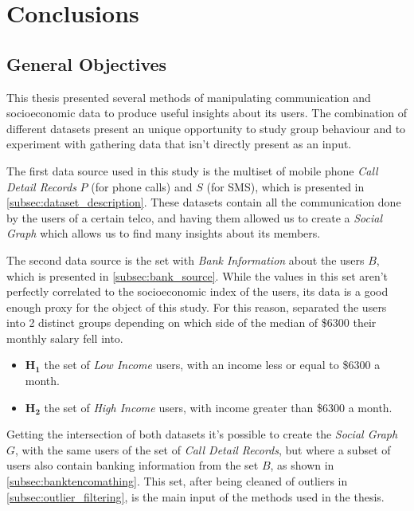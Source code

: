 \chapter{Conclusions}
\label{chap:conclusions}

\section{General Objectives}

This thesis presented several methods of manipulating communication and socioeconomic data to produce useful insights about its users.
The combination of different datasets present an unique opportunity to study group behaviour and to experiment with gathering data that isn't directly present as an input.

The first data source used in this study is the multiset of mobile phone \emph{Call Detail Records} $P$ (for phone calls) and $S$ (for SMS), which is presented in \cref{subsec:dataset_description}.
These datasets contain all the communication done by the users of a certain telco, and having them allowed us to create a \emph{Social Graph} which allows us to find many insights about its members.

The second data source is the set with \emph{Bank Information} about the users $B$, which is presented in \cref{subsec:bank_source}.
While the values in this set aren't perfectly correlated to the socioeconomic index of the users, its data is a good enough proxy for the object of this study.
For this reason, separated the users into 2 distinct groups depending on which side of the median of \$6300\footnotemark{} their monthly salary fell into.


\begin{itemize}
	\item $\mathbf{H_1}$ the set of \emph{Low Income} users, with an income less or equal to \$6300 a month.
	\item $\mathbf{H_2}$ the set of \emph{High Income} users, with income greater than \$6300 a month.
\end{itemize}

Getting the intersection of both datasets it's possible to create the \emph{Social Graph} $G$, with the same users of the set of \emph{Call Detail Records}, but where a subset of users also contain banking information from the set $B$, as shown in \cref{subsec:banktencomathing}.
This set, after being cleaned of outliers in \cref{subsec:outlier_filtering}, is the main input of the methods used in the thesis.


